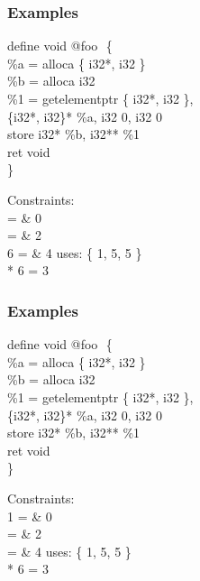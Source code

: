 \documentclass{beamer}
\begin{document}
\begin{frame}[fragile]
\frametitle{Examples}

define void @foo \(\) \{ \\
\hspace{15pt} \green \%a = alloca \{ i32*, i32 \} \\
\hspace{15pt} \normalcolor   \%b = alloca i32 \\
\hspace{15pt}    \%1 = getelementptr \{ i32*, i32 \}, \\
\hspace{30pt}            \{i32*, i32\}* \%a, i32 0, i32 0 \\
\hspace{15pt}    store i32* \%b, i32** \%1 \\
\hspace{15pt}    ret void \\
\}

\vspace{15pt}
Constraints:\\
 = \& 0 \\
 = \& 2 \\
    6 = \& 4 uses: \{ 1, 5, 5 \} \\
    * 6 = 3 \\
\end{frame}


\begin{frame}[fragile]
\frametitle{Examples}

define void @foo \(\) \{ \\
\hspace{15pt}  \%a = alloca \{ i32*, i32 \} \\
\hspace{15pt} \green   \%b = alloca i32 \\
\hspace{15pt} \normalcolor   \%1 = getelementptr \{ i32*, i32 \}, \\
\hspace{30pt}            \{i32*, i32\}* \%a, i32 0, i32 0 \\
\hspace{15pt}    store i32* \%b, i32** \%1 \\
\hspace{15pt}    ret void \\
\}

\vspace{15pt}
Constraints:\\
 1 = \& 0 \\
 = \& 2 \\
 = \& 4 uses: \{ 1, 5, 5 \} \\
    * 6 = 3 \\
\end{frame}
\end{document}
